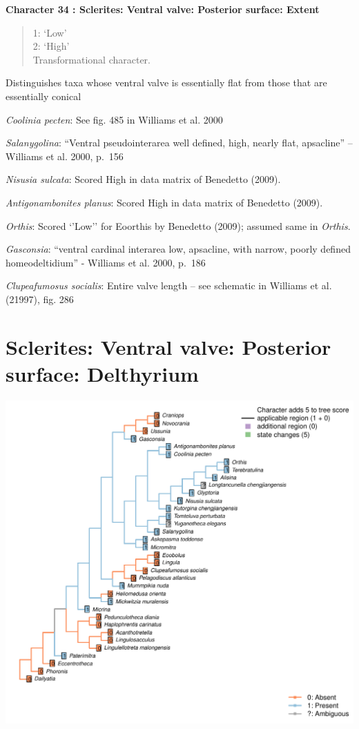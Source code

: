 \documentclass[]{book}
\theoremstyle{definition}
\theoremstyle{definition}
\theoremstyle{definition}
\theoremstyle{remark}
\begin{document}
\textbf{Character 34 : Sclerites: Ventral valve: Posterior surface:
Extent }

\begin{quote}
1: `Low'\\
2: `High'\\
Transformational character.
\end{quote}

Distinguishes taxa whose ventral valve is essentially flat from those
that are essentially conical

\emph{Coolinia pecten}: See fig. 485 in Williams et al. 2000

\emph{Salanygolina}: ``Ventral pseudointerarea well defined, high,
nearly flat, apsacline'' -- Williams et al. 2000, p.~156

\emph{Nisusia sulcata}: Scored High in data matrix of Benedetto (2009).

\emph{Antigonambonites planus}: Scored High in data matrix of Benedetto
(2009).

\emph{Orthis}: Scored `'Low'' for Eoorthis by Benedetto (2009); assumed
same in \emph{Orthis}.

\emph{Gasconsia}: ``ventral cardinal interarea low, apsacline, with
narrow, poorly defined homeodeltidium'' - Williams et al. 2000, p.~186

\emph{Clupeafumosus socialis}: Entire valve length -- see schematic in
Williams et al. (21997), fig. 286

\hypertarget{sclerites-ventral-valve-posterior-surface-delthyrium}{%
\section*{Sclerites: Ventral valve: Posterior surface:
Delthyrium}\label{sclerites-ventral-valve-posterior-surface-delthyrium}}

\includegraphics{Brachiopod_phylogeny_files/figure-latex/unnamed-chunk-5-35.pdf}
\end{document}
